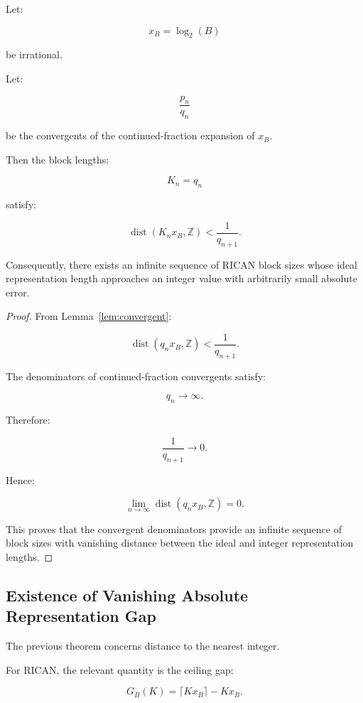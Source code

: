 \documentclass[onecolumn]{IEEEtran}
\begin{document}
\begin{theorem}
\label{thm:convergent}

Let:

\[
x_B=\log_2(B)
\]

be irrational.

Let:

\[
\frac{p_n}{q_n}
\]

be the convergents of the continued-fraction expansion of $x_B$.

Then the block lengths:

\[
K_n=q_n
\]

satisfy:

\[
\operatorname{dist}(K_nx_B,\mathbb{Z})
<
\frac{1}{q_{n+1}} .
\]

Consequently, there exists an infinite sequence of RICAN block sizes
whose ideal representation length approaches an integer value with
arbitrarily small absolute error.

\end{theorem}

\begin{proof}

From Lemma~\ref{lem:convergent}:

\[
\operatorname{dist}(q_nx_B,\mathbb{Z})
<
\frac{1}{q_{n+1}} .
\]

The denominators of continued-fraction convergents satisfy:

\[
q_n\rightarrow\infty .
\]

Therefore:

\[
\frac{1}{q_{n+1}}\rightarrow0 .
\]

Hence:

\[
\lim_{n\rightarrow\infty}
\operatorname{dist}(q_nx_B,\mathbb{Z})
=0 .
\]

This proves that the convergent denominators provide an infinite
sequence of block sizes with vanishing distance between the ideal and
integer representation lengths.

\end{proof}

\subsection{Existence of Vanishing Absolute Representation Gap}

The previous theorem concerns distance to the nearest integer.

For RICAN, the relevant quantity is the ceiling gap:

\[
G_B(K)
=
\lceil Kx_B\rceil-Kx_B .
\]
\end{document}
